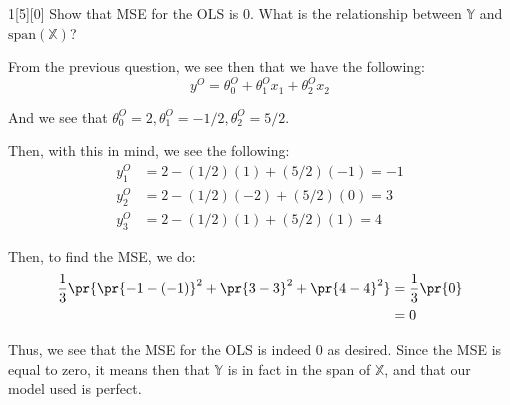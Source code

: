 \documentclass{article}
\begin{document}
\begin{dshw}{1}[5][0]
	Show that MSE for the OLS is 0. What is the relationship between $\mathbb{Y}$ and $\text{span}(\mathbb{X})$?
\end{dshw}
\begin{solution}
	From the previous question, we see then that we have the following:
	\begin{equation*}
		y^{O} = \theta_0^{O} + \theta_1^{O}x_{1} + \theta_2^{O}x_{2}
	\end{equation*}

	And we see that $\theta_0^{O} = 2, \theta_1^{O} = -1/2, \theta_2^{O} = 5/2$.
	
	Then, with this in mind, we see the following:
	\begin{align*}
		y_{1}^{O} &= 2 - (1/2)(1) + (5/2)(-1) = -1 \\
		y_{2}^{O} &= 2 - (1/2)(-2) + (5/2)(0) = 3 \\
		y_{3}^{O} &= 2 - (1/2)(1) + (5/2)(1) = 4
	\end{align*}

	Then, to find the MSE, we do:
	\begin{align*}
		\dfrac{1}{3}\pr{ \pr{-1 - (-1)}^{2} + \pr{3 - 3}^{2} + \pr{4 - 4}^{2}} &= \dfrac{1}{3}\pr{0} \\
		&= 0
	\end{align*}

	Thus, we see that the MSE for the OLS is indeed 0 as desired. Since the MSE is equal to zero, it means then that $\mathbb Y$ is in fact in the span of $\mathbb X$, and that our model used is perfect.
\end{solution}
\end{document}

